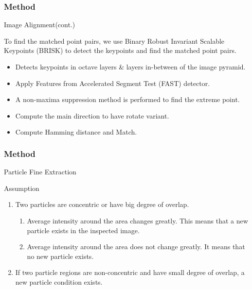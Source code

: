 \documentclass[14pt,hyperref={CJKbookmarks=true}]{beamer}
\theoremstyle{plain}
\theoremstyle{definition}
\theoremstyle{remark}
\begin{document}
\begin{frame}
\frametitle{Method}{Image Alignment(cont.)}

\small
To find the matched point pairs, we use Binary Robust Invariant Scalable Keypoints (BRISK) to detect the keypoints and find the matched point pairs.
\begin{itemize}
\item Detects keypoints in octave layers \& layers in-between of the image pyramid.
\item Apply Features from Accelerated Segment Test (FAST) detector.
\item A non-maxima suppression method is performed to find the extreme point.
\item Compute the main direction to have rotate variant.
\item Compute Hamming distance and Match.
\end{itemize}
\end{frame}
\begin{frame}
\frametitle{Method}{Particle Fine Extraction}
\begin{block}{Assumption}
\begin{enumerate}
\item Two particles are concentric or have big degree of overlap.
    \begin{enumerate}
      \item Average intensity around the area changes greatly. This means that a new particle exists in the inspected image.
      \item Average intensity around the area does not change greatly. It means that no new particle exists.
    \end{enumerate}
\item If two particle regions are non-concentric and have small degree of overlap, a new particle condition exists.
\end{enumerate}
\end{block}
\end{frame}
\end{document}
